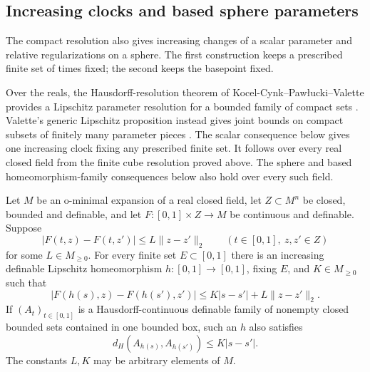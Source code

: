 \subsection{Increasing clocks and based sphere parameters}
The compact resolution also gives increasing changes of a scalar
parameter and relative regularizations on a sphere.  The first
construction keeps a prescribed finite set of times fixed; the second
keeps the basepoint fixed.


Over the reals, the Hausdorff-resolution theorem of
Kocel-Cynk--Paw\l ucki--Valette provides a Lipschitz parameter
resolution for a bounded family of compact sets
\cite[Main Theorem, author manuscript p.~1]{KocelCynkPawluckiValette2014}.
Valette's generic Lipschitz proposition instead gives joint bounds
on compact subsets of finitely many parameter pieces
\cite[Proposition~5.7, pp.~25--26; scope on p.~22]{Valette2022RegularVectors}.
The scalar consequence below gives one increasing clock fixing
any prescribed finite set. It follows over every real closed field
from the finite cube resolution proved above. The sphere and based
homeomorphism-family consequences below also hold over every such field.

\begin{corollary}
\label{cor:increasing-definable-clock}
Let $M$ be an o-minimal expansion of a real closed field, let
$Z\subset M^n$ be closed, bounded and definable, and let
$F:[0,1]\times Z\to M$ be continuous and definable.  Suppose
\[
 |F(t,z)-F(t,z')|\le L\|z-z'\|_2
 \qquad(t\in[0,1],\ z,z'\in Z)
\]
for some $L\in M_{\ge0}$.  For every finite set $E\subset[0,1]$
there is an increasing definable Lipschitz homeomorphism
$h:[0,1]\to[0,1]$, fixing $E$, and $K\in M_{\ge0}$ such that
\[
 |F(h(s),z)-F(h(s'),z')|
 \le K|s-s'|+L\|z-z'\|_2.
\]
If $(A_t)_{t\in[0,1]}$ is a Hausdorff-continuous definable family
of nonempty closed bounded sets contained in one bounded box, such
an $h$ also satisfies
\[
 d_H(A_{h(s)},A_{h(s')})\le K|s-s'|.
\]
The constants $L,K$ may be arbitrary elements of $M$.
\end{corollary}

